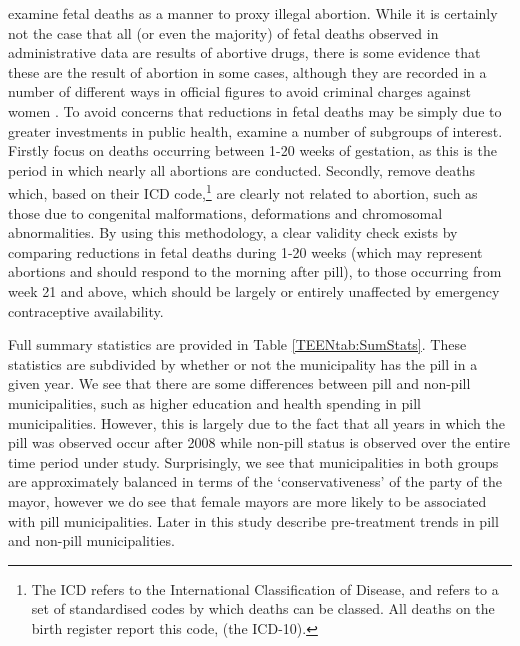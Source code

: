 \Person examine fetal deaths as a manner to proxy illegal abortion.  While it 
is certainly not the case that all (or even the majority) of fetal deaths 
observed in administrative data are results of abortive drugs, there is some
evidence that these are the result of abortion in some cases, although they are 
recorded in a number of different ways in official figures to avoid criminal 
charges against women \citep{ShepardCasas2007}.  To avoid concerns that 
reductions in fetal deaths may be simply due to greater investments in public
health, \person examine a number of subgroups of interest.  Firstly \person focus 
on deaths occurring between 1-20 weeks of gestation, as this is the period in 
which nearly all abortions are conducted.  Secondly, \person remove deaths which,
based on their ICD code,\footnote{The ICD refers to the International 
Classification of Disease, and refers to a set of standardised codes by which
deaths can be classed.  All deaths on the birth register report this code,
(the ICD-10).} are clearly not related to abortion, such as those due to 
congenital malformations, deformations and chromosomal abnormalities.  By
using this methodology, a clear validity check exists by comparing reductions
in fetal deaths during 1-20 weeks (which may represent abortions and should
respond to the morning after pill), to those occurring from week 21 and above,
which should be largely or entirely unaffected by emergency contraceptive
availability.

Full summary statistics are provided in Table \ref{TEENtab:SumStats}.  These
statistics are subdivided by whether or not the municipality has the pill in
a given year.  We see that there are some differences between pill and non-pill
municipalities, such as higher education and health spending in pill 
municipalities.  However, this is largely due to the fact that all years in which
the pill was observed occur after 2008 while non-pill status is observed over
the entire time period under study.  Surprisingly, we see that municipalities in
both groups are approximately balanced in terms of the `conservativeness' of the
party of the mayor, however we do see that female mayors are more likely to be
associated with pill municipalities.  Later in this study \person describe 
pre-treatment trends in pill and non-pill municipalities.

